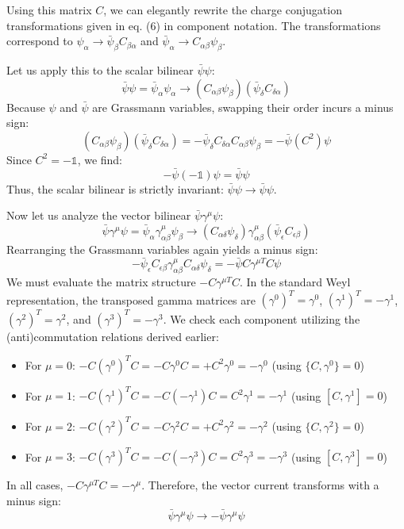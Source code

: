 Using this matrix $C$, we can elegantly rewrite the charge conjugation transformations given in eq. (6) in component notation. The transformations correspond to $\psi_\alpha \to \bar{\psi}_\beta C_{\beta\alpha}$ and $\bar{\psi}_\alpha \to C_{\alpha\beta}\psi_\beta$.

Let us apply this to the scalar bilinear $\bar{\psi}\psi$:
\[
    \bar{\psi}\psi = \bar{\psi}_\alpha \psi_\alpha \to (C_{\alpha\beta}\psi_\beta)(\bar{\psi}_\delta C_{\delta\alpha})
\]
Because $\psi$ and $\bar{\psi}$ are Grassmann variables, swapping their order incurs a minus sign:
\[
    (C_{\alpha\beta}\psi_\beta)(\bar{\psi}_\delta C_{\delta\alpha}) = - \bar{\psi}_\delta C_{\delta\alpha} C_{\alpha\beta} \psi_\beta = -\bar{\psi} (C^2) \psi
\]
Since $C^2 = -\mathbb{1}$, we find:
\[
    -\bar{\psi} (-\mathbb{1}) \psi = \bar{\psi}\psi
\]
Thus, the scalar bilinear is strictly invariant: $\bar{\psi}\psi \to \bar{\psi}\psi$.

Now let us analyze the vector bilinear $\bar{\psi}\gamma^\mu\psi$:
\[
    \bar{\psi}\gamma^\mu\psi = \bar{\psi}_\alpha \gamma^\mu_{\alpha\beta} \psi_\beta \to (C_{\alpha\delta}\psi_\delta) \gamma^\mu_{\alpha\beta} (\bar{\psi}_\epsilon C_{\epsilon\beta})
\]
Rearranging the Grassmann variables again yields a minus sign:
\[
    - \bar{\psi}_\epsilon C_{\epsilon\beta} \gamma^\mu_{\alpha\beta} C_{\alpha\delta} \psi_\delta = - \bar{\psi} C \gamma^{\mu T} C \psi
\]
We must evaluate the matrix structure $-C \gamma^{\mu T} C$. In the standard Weyl representation, the transposed gamma matrices are $(\gamma^0)^T = \gamma^0$, $(\gamma^1)^T = -\gamma^1$, $(\gamma^2)^T = \gamma^2$, and $(\gamma^3)^T = -\gamma^3$. We check each component utilizing the (anti)commutation relations derived earlier:
\begin{itemize}
    \item For $\mu = 0$: $-C (\gamma^0)^T C = -C \gamma^0 C = +C^2 \gamma^0 = -\gamma^0$ (using $\{C, \gamma^0\} = 0$)
    \item For $\mu = 1$: $-C (\gamma^1)^T C = -C (-\gamma^1) C = C^2 \gamma^1 = -\gamma^1$ (using $[C, \gamma^1] = 0$)
    \item For $\mu = 2$: $-C (\gamma^2)^T C = -C \gamma^2 C = +C^2 \gamma^2 = -\gamma^2$ (using $\{C, \gamma^2\} = 0$)
    \item For $\mu = 3$: $-C (\gamma^3)^T C = -C (-\gamma^3) C = C^2 \gamma^3 = -\gamma^3$ (using $[C, \gamma^3] = 0$)
\end{itemize}
In all cases, $-C \gamma^{\mu T} C = -\gamma^\mu$. Therefore, the vector current transforms with a minus sign:
\[
    \bar{\psi}\gamma^\mu\psi \to -\bar{\psi}\gamma^\mu\psi
\]

